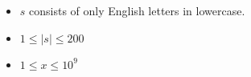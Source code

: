 \begin{itemize}
\tightlist
\item $s$ consists of only English letters in lowercase.
\item $1\le |s| \le 200$
\item $1\le x \le 10^9$
\end{itemize}
